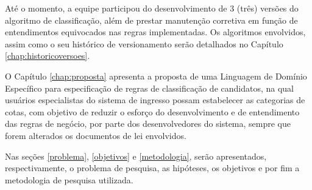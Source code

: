 Até o momento, a equipe participou do desenvolvimento de 3 (três) versões do algoritmo de classificação, além de prestar manutenção corretiva em função de entendimentos equivocados nas regras implementadas.  Os algoritmos envolvidos, assim como o seu histórico de versionamento serão detalhados no Capítulo \ref{chap:historicoversoes}.

O Capítulo \ref{chap:proposta} apresenta a proposta de uma Linguagem de Domínio Específico para especificação de regras de classificação de candidatos, na qual usuários especialistas do sistema de ingresso possam estabelecer as categorias de cotas, com objetivo de reduzir o esforço do desenvolvimento e de entendimento das regras de negócio, por parte dos desenvolvedores do sistema, sempre que forem alterados os documentos de lei envolvidos.

Nas seções \ref{problema}, \ref{objetivos}  e \ref{metodologia}, serão apresentados, respectivamente, o problema de pesquisa, as hipóteses, os objetivos e por fim a metodologia de pesquisa utilizada.
